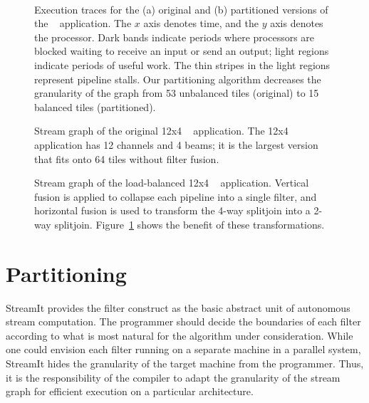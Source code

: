 \begin{figure}
   \\
  \hspace{0.3in}  \vspace{-6pt} \caption{\protect\small Execution
    traces for the (a) original and (b) partitioned versions of the
    \Radar~ application.  The $x$ axis denotes time, and the $y$ axis
    denotes the processor.  Dark bands indicate periods where
    processors are blocked waiting to receive an input or send an
    output; light regions indicate periods of useful work.  The thin
    stripes in the light regions represent pipeline stalls.  Our
    partitioning algorithm decreases the granularity of the graph from
    53 unbalanced tiles (original) to 15 balanced tiles (partitioned).
    \protect\label{fig:beam-blood}}
\vspace{-12pt}
\end{figure}

\begin{figure}
\centering
{}
\caption{\protect\small Stream graph of the original 12x4 \Radar~
application.  The 12x4 \Radar application has 12 channels and 4 beams;
it is the largest version that fits onto 64 tiles without filter
fusion.  \protect\label{fig:beam-orig}}
\vspace{36pt}
\caption{\protect\small Stream graph of the load-balanced 12x4
\Radar~ application.  Vertical fusion is applied to collapse each pipeline
into a single filter, and horizontal fusion is used to transform the
4-way splitjoin into a 2-way splitjoin.  Figure~\ref{fig:beam-blood}
shows the benefit of these
transformations. \protect\label{fig:beam-opt}}
\end{figure}

\section{Partitioning}
\label{sec:partition}

StreamIt provides the filter construct as the basic abstract unit of
autonomous stream computation.  The programmer should decide the
boundaries of each filter according to what is most natural for the
algorithm under consideration.  While one could envision each filter
running on a separate machine in a parallel system, StreamIt hides the
granularity of the target machine from the programmer.  Thus, it is
the responsibility of the compiler to adapt the granularity of the
stream graph for efficient execution on a particular architecture.

